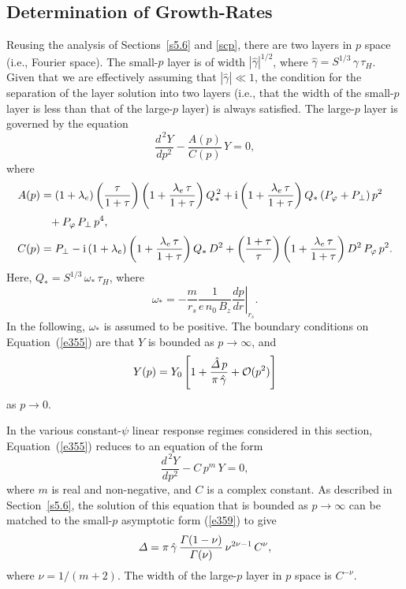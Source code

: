 \documentclass[notitlepage,12pt]{article}
\begin{document}
\subsection{Determination of Growth-Rates}
Reusing the analysis of Sections~\ref{s5.6} and \ref{scp}, there are two layers in $p$ space (i.e., Fourier space). The
small-$p$ layer is of width $|\hat{\gamma}|^{1/2}$, where $\hat{\gamma} = S^{1/3}\,\gamma\,\tau_H$. Given that we are effectively assuming that
$|\hat{\gamma}|\ll 1$, the condition for the separation of the layer solution into two layers (i.e., that the width of the small-$p$ layer is less than that of the large-$p$ layer) is always satisfied. The large-$p$ layer is governed by the equation
\begin{equation}\label{e355}
\frac{d^{\,2} Y}{dp^2} - \frac{A(p)}{C(p)} \,Y =0,
\end{equation}
where 
\begin{align}
A(p) &= (1+\lambda_e)\left(\frac{\tau}{1+\tau}\right)\left(1+ \frac{\lambda_e\,\tau}{1+\tau}\right)Q_\ast^{\,2}
+{\rm i}\left(1+\frac{\lambda_e\,\tau}{1+\tau}\right)Q_\ast\,(P_\varphi+P_\perp)\,p^2\nonumber\\[0.5ex]
&\phantom{=} + P_\varphi\,P_\perp\,p^4,\\[0.5ex]
C(p)&= P_\perp - {\rm i}\,(1+\lambda_e)\left(1+\frac{\lambda_e\,\tau}{1+\tau}\right)Q_\ast\,D^2 +\left(\frac{1+\tau}{\tau}\right)\left(1+\frac{\lambda_e\,\tau}{1+\tau}\right) D^2\,P_\varphi\,p^2.
\end{align}
Here, $Q_\ast = S^{1/3}\,\omega_\ast\,\tau_H$, where
\begin{equation}
\omega_\ast = -\frac{m}{r_s}\frac{1}{e\,n_0\,B_z}\left.\frac{dp}{dr}\right|_{r_s}.
\end{equation}
In the following, $\omega_\ast$ is assumed to be positive. The boundary conditions on Equation~(\ref{e355}) are
that $Y$ is bounded as $p\rightarrow\infty$, and
\begin{equation}\label{e359}
Y(p)= Y_0\left[1+\frac{\hat{\mit\Delta}\,p}{\pi\,\hat{\gamma}} + {\cal O}(p^2)\right]
\end{equation}
as $p\rightarrow 0$. 

In the various constant-$\psi$ linear response regimes considered in this section, Equation~(\ref{e355}) reduces to an equation of the form
\begin{equation}
\frac{d^{\,2} Y}{dp^2} - C\,p^m\,Y = 0,
\end{equation}
where $m$ is real and non-negative, and $C$ is a complex constant. As described in Section~\ref{s5.6}, the solution of this
equation that is bounded as $p\rightarrow \infty$ can be matched to the small-$p$ asymptotic form (\ref{e359}) to give 
\begin{equation}
{\mit\Delta} = \pi\,\hat{\gamma}\,\frac{{\mit\Gamma}(1-\nu)}{{\mit\Gamma}(\nu)}\,\nu^{2\nu-1}\,C^\nu,
\end{equation}
where $\nu=1/(m+2)$. The width of the large-$p$ layer in $p$ space is $C^{-\nu}$. 
\end{document}
